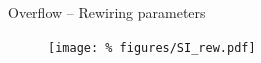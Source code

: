 \begin{frame}{Overflow -- Rewiring parameters}
  
  \begin{figure}
    \centering
    \texttt{[image: \%
    figures/SI\_rew.pdf]} %
  \end{figure}
  

  
\end{frame}
